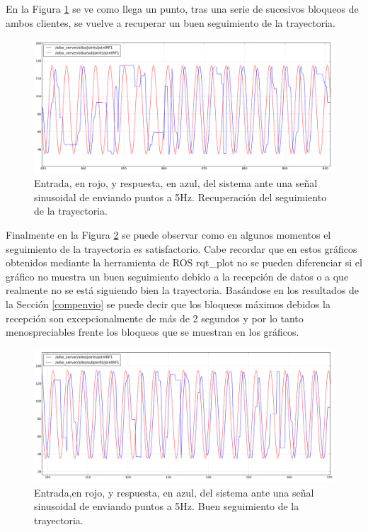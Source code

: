 \documentclass[12pt,a4paper,final,twoside]{book}
\begin{document}
En la Figura \ref{fig:ASrecupera} se ve como llega un punto, tras una serie de sucesivos bloqueos de ambos clientes, se vuelve a recuperar un buen seguimiento de la trayectoria.
 
\begin{figure}[H]
	\centering
    \includegraphics[scale=0.375]{images/sinlegWR/mejorado/recupera.png}
 	\caption{Entrada, en rojo, y respuesta, en azul, del sistema ante una señal sinusoidal de enviando puntos a 5Hz. Recuperación del seguimiento de la trayectoria.}
  \label{fig:ASrecupera}
\end{figure}

Finalmente en la Figura \ref{fig:ASbuena} se puede observar como en algunos momentos el seguimiento de la trayectoria es satisfactorio. Cabe recordar que en estos gráficos obtenidos mediante la herramienta de ROS rqt{\_}plot no se pueden diferenciar si el gráfico no muestra un buen seguimiento debido a la recepción de datos o a que realmente no se está siguiendo bien la trayectoria. Basándose en los resultados de la Sección \ref{compenvio} se puede decir que los bloqueos máximos debidos la recepción son excepcionalmente de más de 2 segundos y por lo tanto menospreciables frente los bloqueos que se muestran en los gráficos.
 \begin{figure}[H]
	\centering
    \includegraphics[scale=0.38]{images/sinlegWR/mejorado/mejor5Hz.png}
 	\caption{Entrada,en rojo, y respuesta, en azul, del sistema ante una señal sinusoidal de enviando puntos a 5Hz. Buen seguimiento de la trayectoria.}
  \label{fig:ASbuena}
\end{figure}
\end{document}
